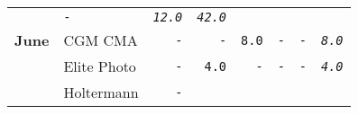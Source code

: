 \documentclass[11pt,A4paper,]{article}
\begin{document}
\begin{longtable}[]{@{}llrrrrrr@{}}
\begin{minipage}[t]{0.12\columnwidth}
\end{minipage} & \begin{minipage}[t]{0.12\columnwidth}\raggedleft\strut
\emph{\texttt{-}}\strut
\end{minipage} & \begin{minipage}[t]{0.12\columnwidth}\raggedleft\strut
\emph{\texttt{12.0}}\strut
\end{minipage} & \begin{minipage}[t]{0.12\columnwidth}\raggedleft\strut
\emph{\texttt{42.0}}\strut
\end{minipage}\tabularnewline
\textbf{June} & CGM CMA & \texttt{-} & \texttt{-} & \texttt{8.0} &
\texttt{-} & \texttt{-} & \emph{\texttt{8.0}}\tabularnewline
\begin{minipage}[t]{0.12\columnwidth}\raggedright\strut
\strut
\end{minipage} & \begin{minipage}[t]{0.12\columnwidth}\raggedright\strut
Elite Photo\strut
\end{minipage} & \begin{minipage}[t]{0.12\columnwidth}\raggedleft\strut
\texttt{-}\strut
\end{minipage} & \begin{minipage}[t]{0.12\columnwidth}\raggedleft\strut
\texttt{4.0}\strut
\end{minipage} & \begin{minipage}[t]{0.12\columnwidth}\raggedleft\strut
\texttt{-}\strut
\end{minipage} & \begin{minipage}[t]{0.12\columnwidth}\raggedleft\strut
\texttt{-}\strut
\end{minipage} & \begin{minipage}[t]{0.12\columnwidth}\raggedleft\strut
\texttt{-}\strut
\end{minipage} & \begin{minipage}[t]{0.12\columnwidth}\raggedleft\strut
\emph{\texttt{4.0}}\strut
\end{minipage}\tabularnewline
\begin{minipage}[t]{0.12\columnwidth}\raggedright\strut
\strut
\end{minipage} & \begin{minipage}[t]{0.12\columnwidth}\raggedright\strut
Holtermann\strut
\end{minipage} & \begin{minipage}[t]{0.12\columnwidth}\raggedleft\strut
\texttt{-}\strut
\end{minipage} & \begin{minipage}[t]{0.12\columnwidth}\raggedleft\strut

\end{minipage}
\end{longtable}
\end{document}
